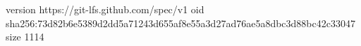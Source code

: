 version https://git-lfs.github.com/spec/v1
oid sha256:73d82b6e5389d2dd5a71243d655af8e55a3d27ad76ae5a8dbc3d88bc42c33047
size 1114
